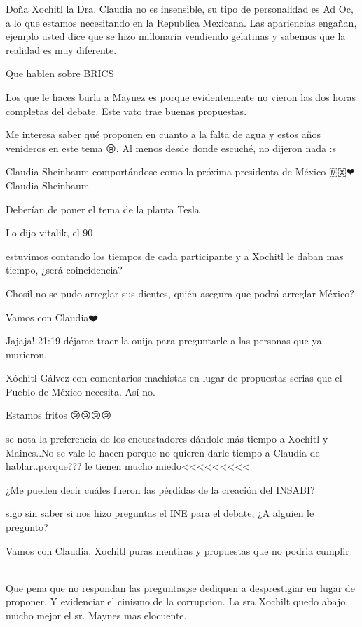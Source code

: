 Doña Xochitl la Dra. Claudia no es insensible, su  tipo de personalidad es Ad Oc, a lo que estamos necesitando en la Republica Mexicana. Las apariencias engañan, ejemplo usted dice que se hizo millonaria vendiendo gelatinas y sabemos que la realidad es muy diferente.

Que hablen sobre BRICS

Los que le haces burla a Maynez es porque evidentemente no vieron las dos horas completas del debate.
Este vato trae buenas propuestas. ✌🏻

Me interesa saber qué proponen en cuanto a la falta de agua y estos años venideros en este tema 😢. Al menos desde donde escuché, no dijeron nada :s

Claudia Sheinbaum comportándose como la próxima presidenta de México 🇲🇽❤
Claudia Sheinbaum 💪💪💪

Deberían de poner el tema de la planta Tesla

Lo dijo vitalik, el 90%

estuvimos contando los tiempos de cada participante y a Xochitl le daban mas tiempo, ¿será coincidencia?

Chosil no se pudo arreglar sus dientes, quién asegura que podrá arreglar México?

Vamos con Claudia❤️

Jajaja! 21:19 déjame traer la ouija para preguntarle a las personas que ya murieron.

Xóchitl Gálvez con comentarios machistas en lugar de propuestas serias que el Pueblo de México necesita. Así no.

Estamos fritos 😢😢😢😢

se nota la preferencia de los encuestadores dándole más tiempo a Xochitl y  Maines..No se vale lo hacen porque no quieren darle tiempo a Claudia de hablar..porque??? le tienen mucho miedo<<<<<<<<<

¿Me pueden decir cuáles fueron las pérdidas de la creación del INSABI?

sigo sin saber si nos hizo preguntas el INE para el debate, ¿A alguien le pregunto?

Vamos con Claudia, Xochitl puras mentiras   y propuestas que no podria cumplir 🤥🤗🤗🤗🤗🤗🤗🤗🤗🤗

Que pena que  no respondan las preguntas,se dediquen a desprestigiar en lugar de proponer.  Y evidenciar el cinismo de la corrupcion. La sra Xochilt quedo abajo, mucho mejor el sr. Maynes mas elocuente.

